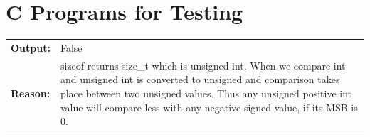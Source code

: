 \documentclass[a4paper,oneside]{book}
\begin{document}
\begin{mdframed}[style=MyFrame]
\inputminted{c}{Algorithms/DynamicProgramming/printLCSDP.c}\label{lst:dp_lcs}\end{mdframed}\newpage
\begin{mdframed}[style=MyFrame]
\inputminted{c}{Algorithms/DynamicProgramming/editDistance.c}\label{lst:dp_edit_distance}\end{mdframed}\newpage
\restoregeometry








\part{C Programs for Testing}
\begin{mdframed}[style=MyFrame]
\begin{tabular}[H]{p{1.5cm}p{15cm}}
\textbf{Output:} & False \\
\textbf{Reason:} & sizeof returns size\_t which is unsigned int. When we compare int and unsigned int is converted to unsigned and comparison takes place between two unsigned values. Thus any unsigned positive int value will compare less with any negative signed value, if its MSB is 0.\\
\end{tabular}
\end{mdframed}
\end{document}
